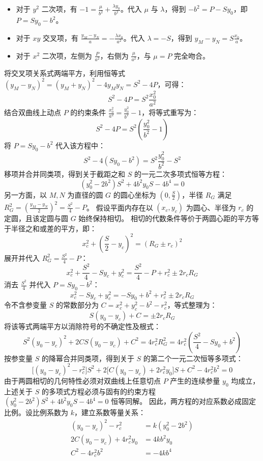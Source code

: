 \begin{solution}
\begin{itemize}
\item 对于 $y^2$ 二次项，有 $-1 = \frac{\mu}{b^2} + \frac{\lambda y_0}{b^2}$。代入 $\mu$ 与 $\lambda$，得到 $-b^2 = P - S y_0$，即 $P = S y_0 - b^2$。
\item 对于 $xy$ 交叉项，有 $\frac{y_M - y_N}{a} = -\frac{\lambda x_0}{a^2}$。代入 $\lambda = -S$，得到 $y_M - y_N = S \frac{x_0}{a}$。
\item 对于 $x^2$ 二次项，左侧为 $\frac{P}{a^2}$，右侧为 $\frac{\mu}{a^2}$，与 $\mu = P$ 完全吻合。
\end{itemize}
将交叉项关系式两端平方，利用恒等式 $(y_M - y_N)^2 = (y_M + y_N)^2 - 4y_M y_N = S^2 - 4P$，可得：
$$ S^2 - 4P = S^2 \frac{x_0^2}{a^2} $$
结合双曲线上动点 $P$ 的约束条件 $\frac{x_0^2}{a^2} = \frac{y_0^2}{b^2} - 1$，将等式重写为：
$$ S^2 - 4P = S^2 \left(\frac{y_0^2}{b^2} - 1\right) $$
将 $P = S y_0 - b^2$ 代入该方程中：
$$ S^2 - 4(S y_0 - b^2) = S^2 \frac{y_0^2}{b^2} - S^2 $$
移项并合并同类项，得到关于截距之和 $S$ 的一元二次多项式恒等方程：
$$ (y_0^2 - 2b^2)S^2 + 4b^2 y_0 S - 4b^4 = 0 $$
另一方面，以 $M, N$ 为直径的圆 $G$ 的圆心坐标为 $\left(0, \frac{S}{2}\right)$，半径 $R_G$ 满足 $R_G^2 = \left(\frac{y_M - y_N}{2}\right)^2 = \frac{S^2}{4} - P$。
假设平面内存在以 $(x_c, y_c)$ 为圆心、半径为 $r_c$ 的定圆，且该定圆与圆 $G$ 始终保持相切。
相切的代数条件等价于两圆心距的平方等于半径之和或差的平方，即：
$$ x_c^2 + \left(\frac{S}{2} - y_c\right)^2 = (R_G \pm r_c)^2 $$
展开并代入 $R_G^2 = \frac{S^2}{4} - P$：
$$ x_c^2 + \frac{S^2}{4} - S y_c + y_c^2 = \frac{S^2}{4} - P + r_c^2 \pm 2r_c R_G $$
消去 $\frac{S^2}{4}$ 并代入 $P = S y_0 - b^2$：
$$ x_c^2 - S y_c + y_c^2 = -S y_0 + b^2 + r_c^2 \pm 2r_c R_G $$
令不含参变量 $S$ 的常数部分为 $C = x_c^2 + y_c^2 - b^2 - r_c^2$，等式整理为：
$$ S(y_0 - y_c) + C = \pm 2r_c R_G $$
将该等式两端平方以消除符号的不确定性及根式：
$$ S^2(y_0 - y_c)^2 + 2C S(y_0 - y_c) + C^2 = 4r_c^2 R_G^2 = 4r_c^2 \left(\frac{S^2}{4} - S y_0 + b^2\right) $$
按参变量 $S$ 的降幂合并同类项，得到关于 $S$ 的第二个一元二次恒等多项式：
$$ \big[(y_0 - y_c)^2 - r_c^2\big]S^2 + 2\big[C(y_0 - y_c) + 2r_c^2 y_0\big]S + C^2 - 4r_c^2 b^2 = 0 $$
由于两圆相切的几何特性必须对双曲线上任意切点 $P$ 产生的连续参量 $y_0$ 均成立，上述关于 $S$ 的多项式方程必须与固有的约束方程 $(y_0^2 - 2b^2)S^2 + 4b^2 y_0 S - 4b^4 = 0$ 恒等同解。
因此，两方程的对应系数必成固定比例。设比例系数为 $k$，建立系数等量关系：
\begin{align*}
(y_0 - y_c)^2 - r_c^2 &= k(y_0^2 - 2b^2) \\
2C(y_0 - y_c) + 4r_c^2 y_0 &= 4k b^2 y_0 \\
C^2 - 4r_c^2 b^2 &= -4k b^4

\end{align*}
\end{solution}
